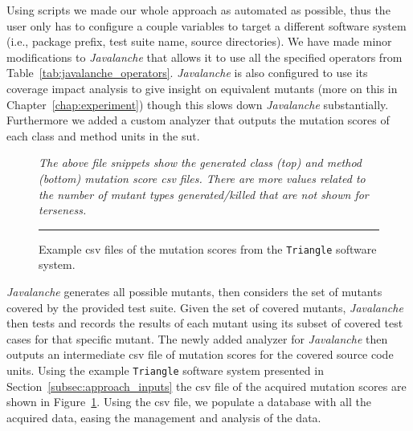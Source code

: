 Using scripts we made our whole approach as automated as possible, thus the user only has to configure a couple variables to target a different software system (i.e., package prefix, test suite name, source directories). We have made minor modifications to \emph{Javalanche} that allows it to use all the specified operators from Table~\ref{tab:javalanche_operators}. \emph{Javalanche} is also configured to use its coverage impact analysis to give insight on equivalent mutants (more on this in Chapter~\ref{chap:experiment}) though this slows down \emph{Javalanche} substantially. Furthermore we added a custom analyzer that outputs the mutation scores of each class and method units in the \gls{sut}.

\begin{figure}[!tb]
  \centering
  
  
  \caption{Example \gls{csv} files of the mutation scores from the \texttt{Triangle} software system.}
  \vspace{1mm}
  \footnotesize{\emph{The above file snippets show the generated class (top) and method (bottom) mutation score \gls{csv} files. There are more values related to the number of mutant types generated/killed that are not shown for terseness.}}
  \vspace{2mm}
  \hrule
  \label{fig:triangle_mutation_scores}
\end{figure}

\emph{Javalanche} generates all possible mutants, then considers the set of mutants covered by the provided test suite. Given the set of covered mutants, \emph{Javalanche} then tests and records the results of each mutant using its subset of covered test cases for that specific mutant. The newly added analyzer for \emph{Javalanche} then outputs an intermediate \gls{csv} file of mutation scores for the covered source code units. Using the example \texttt{Triangle} software system presented in Section~\ref{subsec:approach_inputs} the \gls{csv} file of the acquired mutation scores are shown in Figure~\ref{fig:triangle_mutation_scores}. Using the \gls{csv} file, we populate a database with all the acquired data, easing the management and analysis of the data.


